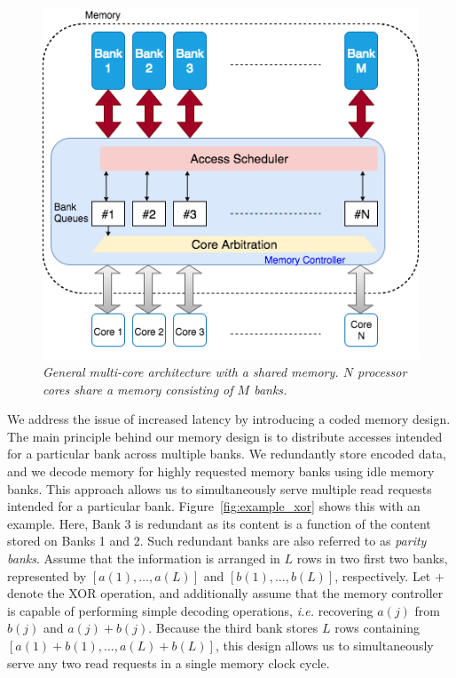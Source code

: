 \begin{figure}[t!]
\centering
\includegraphics[width=\linewidth]{fig/fig-2-memory-controller.png}
\caption{\it{General multi-core architecture with a shared memory. $N$ processor cores share a memory consisting of $M$ banks.}}
\label{fig:multicore_arch}
\end{figure}
We address the issue of increased latency by introducing a coded memory design. The main principle behind our memory design is to distribute accesses intended for a particular bank across multiple banks. We redundantly store encoded data, and we decode memory for highly requested memory banks using idle memory banks. This approach allows us to simultaneously serve multiple read requests intended for a particular bank. Figure~\ref{fig:example_xor} shows this with an example. Here, Bank 3 is redundant as its content is a function of the content stored on Banks 1 and 2. Such redundant banks are also referred to as {\em parity banks}. Assume that the information is arranged in $L$ rows in two first two banks, represented by $[a(1),\ldots, a(L)]$ and $[b(1),\ldots, b(L)]$, respectively. Let $+$ denote the XOR operation, and additionally assume that the memory controller is capable of performing simple decoding operations, \textit{i.e.} recovering $a(j)$ from $b(j)$ and $a(j) + b(j)$. Because the third bank stores $L$ rows containing $[a(1) + b(1),\ldots, a(L) + b(L)]$, this design allows us to simultaneously serve any two read requests in a single memory clock cycle.   


